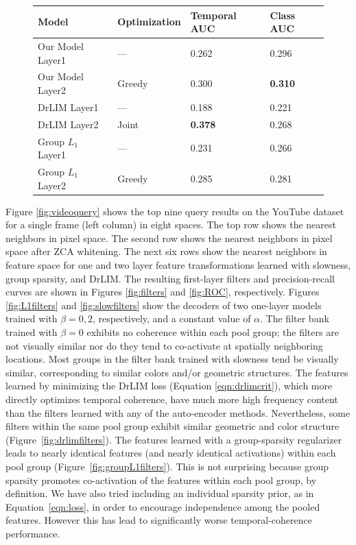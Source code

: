 \documentclass{article} %
\begin{document}
\begin{figure}
  \centering
\begin{tabular}{| l | l | l | l |} 
\hline 
Model & Optimization & Temporal AUC & Class AUC \\ \hline
 Our Model Layer1 & --- & 0.262 & 0.296 \\
 Our Model Layer2 & Greedy & 0.300 & \bf{0.310} \\
 DrLIM Layer1 & --- & 0.188 & 0.221 \\
 DrLIM Layer2 & Joint & \bf{0.378} & 0.268 \\
 Group $L_1$ Layer1 & --- & 0.231 & 0.266 \\
 Group $L_1$ Layer2 & Greedy & 0.285 & 0.281 \\
 \hline
\end{tabular}
\end{figure} 
Figure \ref{fig:videoquery} shows the top nine query results on the YouTube dataset for a single frame (left column) in eight spaces. The top row shows the nearest neighbors in pixel space. The second row shows the nearest neighbors in pixel space after ZCA whitening. The next six rows show the nearest neighbors in feature space for one and two layer feature transformations learned with slowness, group sparsity, and DrLIM. The resulting first-layer filters and precision-recall curves are shown in Figures \ref{fig:filters} and \ref{fig:ROC}, respectively.   
Figures \ref{fig:L1filters} and \ref{fig:slowfilters} show the decoders of two one-layer models trained with $\beta = 0,2$, respectively, and a constant value of $\alpha$. The filter bank trained with $\beta = 0$ exhibits no coherence within each pool group; the filters are not visually similar nor do they tend to co-activate at spatially neighboring locations. Most groups in the filter bank trained with slowness tend be visually similar, corresponding to similar colors and/or geometric structures. The features learned by minimizing the DrLIM loss (Equation \ref{eqn:drlimcrit}), which more directly optimizes temporal coherence, have much more high frequency content than the filters learned with any of the auto-encoder methods. Nevertheless, some filters within the same pool group exhibit similar geometric and color structure (Figure~\ref{fig:drlimfilters}). The features learned with a group-sparsity regularizer leads to nearly identical features (and nearly identical activations) within each pool group (Figure~\ref{fig:groupL1filters}). This is not surprising because group sparsity promotes co-activation of the features within each pool group, by definition. We have also tried including an individual sparsity prior, as in Equation~\ref{eqn:loss}, in order to encourage independence among the pooled features. However this has lead to significantly worse temporal-coherence performance.
\end{document}
